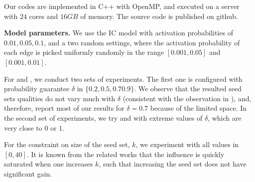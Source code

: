 Our codes are implemented in C++ with OpenMP, and executed on a server with $24$ cores and $16GB$ of memory. The source code is published on github.

\noindent
\textbf{Model parameters.} We use the IC model with activation probabilities of $0.01, 0.05, 0.1$, and a two random settings, where the activation probability of each edge is picked uniformly randomly in the range $[0.001, 0.05]$ and $[0.001, 0.01]$.

For \infprobheu{} and \multicritalgo{}, we conduct two sets of experiments. The first one is configured with probability guarantee $\delta$ in $\{0.2, 0.5, 0.7 0.9\}$.
We observe that the resulted seed sets qualities do not vary much with $\delta$ (consistent with the observation in \cite{zhang:kdd14}), and, therefore, report most of our results for $\delta=0.7$ because of the limited space. In the second set of experiments, we try \infprobheu{} and \multicritalgo{} with extreme values of $\delta$, which are very close to $0$ or $1$.

For the constraint on size of the seed set, $k$, we experiment with all values in $[0,40]$. It is known from the related works that the influence is quickly saturated when one increases $k$, such that increasing the seed set does not have significant gain.

\vspace{-0.05in}
